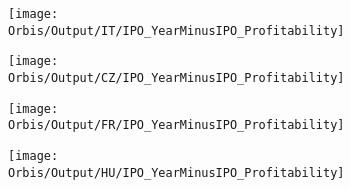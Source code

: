 \documentclass[12pt,notitlepage]{article}
\begin{document}
\begin{figure}[htpb]
\centering
\caption{IPO and Profitability}
\begin{subfigure}{.49\textwidth}
    \centering
 \texttt{[image: Orbis/Output/IT/IPO\_YearMinusIPO\_Profitability]}
\end{subfigure}%
\begin{subfigure}{.49\textwidth}
    \centering
 \texttt{[image: Orbis/Output/CZ/IPO\_YearMinusIPO\_Profitability]}
\end{subfigure}
\begin{subfigure}{.49\textwidth}
    \centering
 \texttt{[image: Orbis/Output/FR/IPO\_YearMinusIPO\_Profitability]}
\end{subfigure}%
\begin{subfigure}{.49\textwidth}
    \centering
 \texttt{[image: Orbis/Output/HU/IPO\_YearMinusIPO\_Profitability]}
\end{subfigure}
\end{figure}
\end{document}

